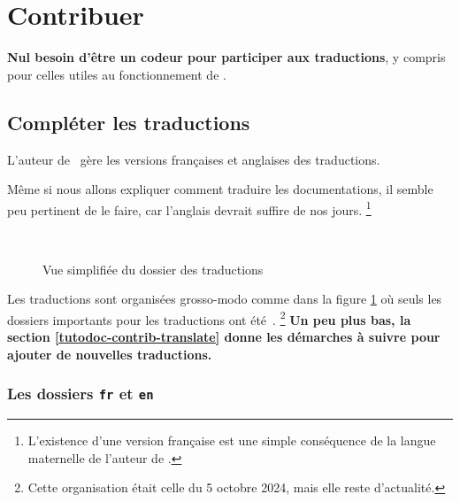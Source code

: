 \section{Contribuer}

\begin{tdocnote}
    \textbf{Nul besoin d'être un codeur pour participer aux traductions}, y compris pour celles utiles au fonctionnement de \thisproj.
\end{tdocnote}



\subsection{Compléter les traductions}

\begin{tdocnote}
    L'auteur de \thisproj\ gère les versions françaises et anglaises des traductions.
\end{tdocnote}


\begin{tdoccaut}
    Même si nous allons expliquer comment traduire les documentations, il semble peu pertinent de le faire, car l'anglais devrait suffire de nos jours.%
    \footnote{
        L'existence d'une version française est une simple conséquence de la langue maternelle de l'auteur de \thisproj.
    }
\end{tdoccaut}

\begin{figure}[ht]
    \centering
    \contribtranslatedirtree\
    \caption{Vue simplifiée du dossier des traductions}
    \label{tutodoc-contrib-translate-dir}
\end{figure}


Les traductions sont organisées grosso-modo comme dans la figure \ref{tutodoc-contrib-translate-dir} où seuls les dossiers importants pour les traductions ont été \,.%
\footnote{
    Cette organisation était celle du 5 octobre 2024, mais elle reste d'actualité.
}
\textbf{Un peu plus bas, la section \ref{tutodoc-contrib-translate} donne les démarches à suivre pour ajouter de nouvelles traductions.}


\subsubsection{Les dossiers \texttt{fr} et \texttt{en}}

